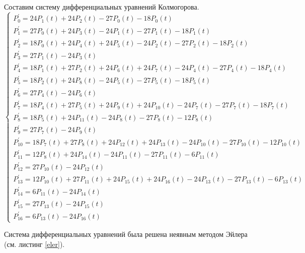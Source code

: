 Составим систему дифференциальных уравнений Колмогорова.
\[
\begin{cases}
    P^\prime_{0} = 24P_{1} (t) +24P_{2} (t) -27P_{0} (t) -18P_{0} (t) \\ 
P^\prime_{1} = 27P_{0} (t) +24P_{3} (t) -24P_{1} (t) -27P_{1} (t) -18P_{1} (t) \\ 
P^\prime_{2} = 18P_{0} (t) +24P_{4} (t) +24P_{5} (t) -24P_{2} (t) -27P_{2} (t) -18P_{2} (t) \\ 
P^\prime_{3} = 27P_{1} (t) -24P_{3} (t) \\ 
P^\prime_{4} = 18P_{1} (t) +27P_{2} (t) +24P_{6} (t) +24P_{7} (t) -24P_{4} (t) -27P_{4} (t) -18P_{4} (t) \\ 
P^\prime_{5} = 18P_{2} (t) +24P_{8} (t) -24P_{5} (t) -27P_{5} (t) -18P_{5} (t) \\ 
P^\prime_{6} = 27P_{4} (t) -24P_{6} (t) \\ 
P^\prime_{7} = 18P_{4} (t) +27P_{5} (t) +24P_{9} (t) +24P_{10} (t) -24P_{7} (t) -27P_{7} (t) -18P_{7} (t) \\ 
P^\prime_{8} = 18P_{5} (t) +24P_{11} (t) -24P_{8} (t) -27P_{8} (t) -12P_{8} (t) \\ 
P^\prime_{9} = 27P_{7} (t) -24P_{9} (t) \\ 
P^\prime_{10} = 18P_{7} (t) +27P_{8} (t) +24P_{12} (t) +24P_{13} (t) -24P_{10} (t) -27P_{10} (t) -12P_{10} (t) \\ 
P^\prime_{11} = 12P_{8} (t) +24P_{14} (t) -24P_{11} (t) -27P_{11} (t) -6P_{11} (t) \\ 
P^\prime_{12} = 27P_{10} (t) -24P_{12} (t) \\ 
P^\prime_{13} = 12P_{10} (t) +27P_{11} (t) +24P_{15} (t) +24P_{16} (t) -24P_{13} (t) -27P_{13} (t) -6P_{13} (t) \\ 
P^\prime_{14} = 6P_{11} (t) -24P_{14} (t) \\ 
P^\prime_{15} = 27P_{13} (t) -24P_{15} (t) \\ 
P^\prime_{16} = 6P_{13} (t) -24P_{16} (t) 
\end{cases}
\]

Система дифференциальных уравнений была решена неявным методом Эйлера (см. листинг \ref{eler}).


